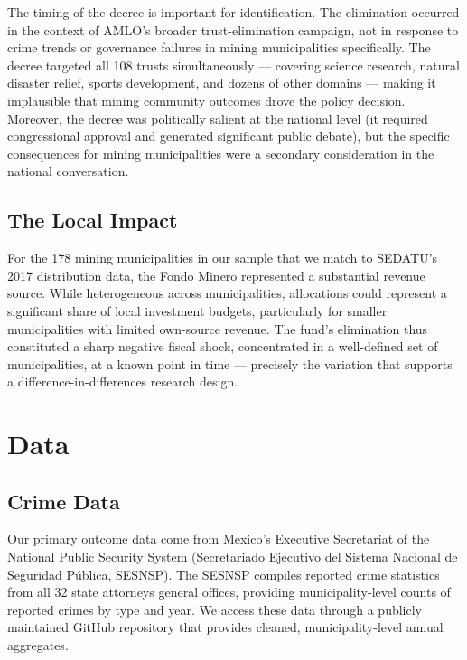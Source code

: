 \documentclass[12pt]{article}
\begin{document}
The timing of the decree is important for identification. The elimination occurred in the context of AMLO's broader trust-elimination campaign, not in response to crime trends or governance failures in mining municipalities specifically. The decree targeted all 108 trusts simultaneously --- covering science research, natural disaster relief, sports development, and dozens of other domains --- making it implausible that mining community outcomes drove the policy decision. Moreover, the decree was politically salient at the national level (it required congressional approval and generated significant public debate), but the specific consequences for mining municipalities were a secondary consideration in the national conversation.

\subsection{The Local Impact}

For the 178 mining municipalities in our sample that we match to SEDATU's 2017 distribution data, the Fondo Minero represented a substantial revenue source. While heterogeneous across municipalities, allocations could represent a significant share of local investment budgets, particularly for smaller municipalities with limited own-source revenue. The fund's elimination thus constituted a sharp negative fiscal shock, concentrated in a well-defined set of municipalities, at a known point in time --- precisely the variation that supports a difference-in-differences research design.


\section{Data}

\subsection{Crime Data}

Our primary outcome data come from Mexico's Executive Secretariat of the National Public Security System (Secretariado Ejecutivo del Sistema Nacional de Seguridad P\'{u}blica, SESNSP). The SESNSP compiles reported crime statistics from all 32 state attorneys general offices, providing municipality-level counts of reported crimes by type and year. We access these data through a publicly maintained GitHub repository that provides cleaned, municipality-level annual aggregates.
\end{document}
